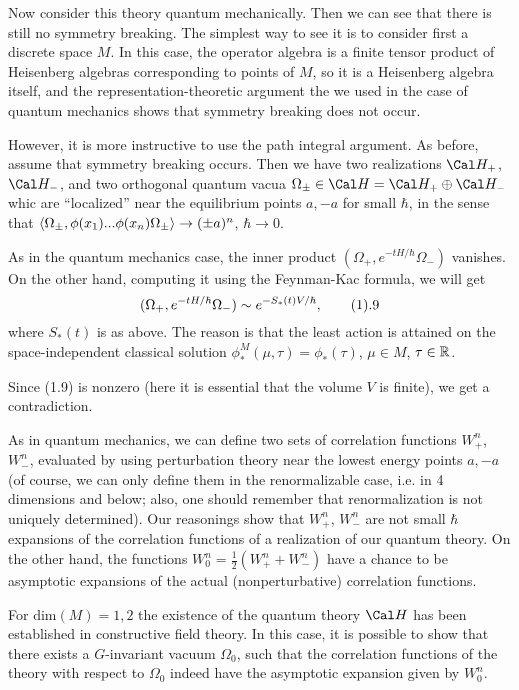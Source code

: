 Now consider this theory quantum mechanically.
Then we can see that there is still no symmetry breaking. 
The simplest way to see it is to consider first a discrete space 
$M$. In this case, the operator algebra is a finite tensor product 
of Heisenberg algebras corresponding to points of $M$, so it is a 
Heisenberg algebra itself, and the representation-theoretic argument 
the we used in the case of quantum mechanics shows that symmetry breaking 
does not occur. 

However, it is more instructive to use the path integral argument. 
As before, assume that symmetry breaking occurs. 
Then we have two realizations $\Cal H_+$, $\Cal H_-$, and 
two orthogonal quantum vacua $\Omega_\pm\in \Cal H=\Cal H_+\oplus\Cal H_-$
whic are ``localized'' near the 
equilibrium points $a,-a$ for small $\hbar$, in the sense 
that $\langle\Omega_\pm,\phi(x_1)...\phi(x_n)\Omega_\pm\rangle\to (\pm a)^n$, 
$\hbar\to 0$. 

As in the quantum mechanics case, the inner product $(\Omega_+,e^{-tH/\hbar}
\Omega_-)$ vanishes. On the other hand, computing it using the Feynman-Kac 
formula, we will get 
$$
(\Omega_+,e^{-tH/\hbar}\Omega_-)\sim e^{-S_*(t)V/\hbar},\tag 1.9
$$
where $S_*(t)$ is as above. The reason is that the least action 
is attained on the space-independent classical solution 
$\phi_*^M(\mu,\tau)=\phi_*(\tau)$, $\mu\in M$, $\tau\in \Bbb R$. 

Since (1.9) is nonzero (here it is essential that the volume $V$ is finite),
we get a contradiction. 

As in quantum mechanics, we can define two sets of correlation functions
$W_+^n$, 
$W_-^n$, evaluated by using perturbation theory 
near the lowest energy points $a,-a$ (of course, we can only define 
them in the renormalizable case, i.e. in 4 dimensions and below;
also, one should remember that renormalization is not uniquely determined).
Our reasonings show that $W_+^n$, $W_-^n$ are not small $\hbar$ expansions 
of the correlation functions of a realization of our quantum
 theory. On the other hand, the functions $W_0^n=\frac{1}{2}(W_+^n+W_-^n)$
have a chance to be asymptotic expansions of the actual 
(nonperturbative) correlation functions. 

For $\text{dim}(M)=1,2$ the existence of the quantum theory $\Cal H$ has been 
established in constructive field theory. In this case, it is possible to show
that there exists a $G$-invariant vacuum $\Omega_0$, such that 
the correlation functions of the theory with respect to $\Omega_0$ 
indeed have the asymptotic expansion given by $W_0^n$. 


